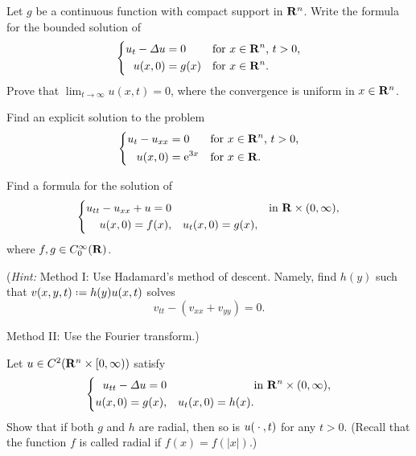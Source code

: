 \begin{problem}
  Let \(g\) be a continuous function with compact support in
  \(\mathbf{R}^n\). Write the formula for the bounded solution of
  \[
    \left\{
      \begin{aligned}
        u_t-\Lap u&=0&&\text{for \(x\in\R^n\), \(t>0\),}\\
        u(x,0)&=g(x)&&\text{for \(x\in\R^n\).}
      \end{aligned}
    \right.
  \]
  Prove that \(\lim_{t\to\infty} u(x,t)=0\), where the convergence is
  uniform in \(x\in\mathbf{R}^n\).
\end{problem}
\begin{solution*}
\end{solution*}

\begin{problem}
  Find an explicit solution to the problem
  \[
    \left\{
      \begin{aligned}
        u_t-u_{xx}&=0&&\text{for \(x\in\mathbf{R}^n\), \(t>0\),}\\
        u(x,0)&=\mathrm{e}^{3x}&&\text{for \(x\in\mathbf{R}\).}
      \end{aligned}
    \right.
  \]
\end{problem}
\begin{solution*}
\end{solution*}

\begin{problem}
  Find a formula for the solution of
  \[
    \left\{
      \begin{aligned}
        u_{tt}-u_{xx}+u=0&&&&\text{in \(\mathbf{R}\times(0,\infty)\),}\\
        u(x,0)=f(x),&&u_t(x,0)=g(x),
      \end{aligned}
    \right.
  \]
  where \(f,g\in C_0^\infty(\mathbf{R})\).

  \noindent (\emph{Hint:} Method I: Use Hadamard's method of
  descent. Namely, find \(h(y)\) such that \(v(x,y,t)\defeq h(y)u(x,t)\)
  solves
  \[
    v_{tt}-(v_{xx}+v_{yy})=0.
  \]

  \noindent Method II: Use the Fourier transform.)
\end{problem}
\begin{solution*}
\end{solution*}

\begin{problem}
  Let \(u\in C^2(\mathbf{R}^n\times[0,\infty))\) satisfy
  \[
    \left\{
      \begin{aligned}
        u_{tt}-\Lap u=0&&&\text{in \(\R^n\times(0,\infty),\)}\\
        u(x,0)=g(x),&&u_t(x,0)=h(x).
      \end{aligned}
    \right.
  \]
  Show that if both \(g\) and \(h\) are radial, then so is \(u({}\cdot{},t)\)
  for any \(t>0\). (Recall that the function \(f\) is called radial if
  \(f(x)=f(|x|)\).)
\end{problem}
\begin{solution*}
\end{solution*}

